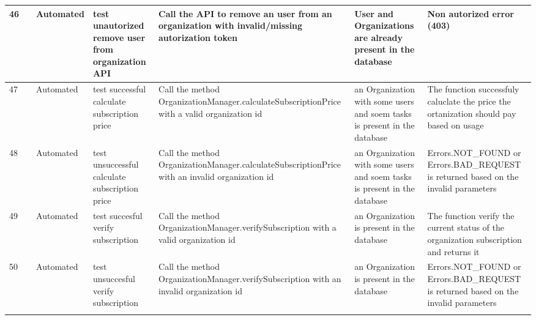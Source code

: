 \documentclass{article}
\begin{document}
{\begin{tabular}{|
      >{\columncolor[HTML]{FFFFFF}}l |
      >{\columncolor[HTML]{FFFFFF}}c |
      >{\columncolor[HTML]{FFFFFF}}l |l|l|l|l|}
    46 & \cellcolor[HTML]{FFFFFF}                                            & {\color[HTML]{11734B} Automated} & test unautorized remove user from organization API  & Call the API to remove an user from an organization with invalid/missing autorization token    & User and Organizations are already present in the database                                                                               & Non autorized error (403)                                                                                            \\ \cline{1-1} \cline{3-7}
    47 & \cellcolor[HTML]{FFFFFF}                                            & {\color[HTML]{11734B} Automated} & test successful calculate subscription price        & Call the method OrganizationManager.calculateSubscriptionPrice with a valid organization id    & an Organization with some users and soem tasks is present in the database                                                                & The function successfuly caluclate the price the ortanization should pay based on usage                              \\ \cline{1-1} \cline{3-7}
    48 & \cellcolor[HTML]{FFFFFF}                                            & {\color[HTML]{11734B} Automated} & test unsuccessful calculate subscription price      & Call the method OrganizationManager.calculateSubscriptionPrice with an invalid organization id & an Organization with some users and soem tasks is present in the database                                                                & Errors.NOT\_FOUND or Errors.BAD\_REQUEST is returned based on the invalid parameters                                 \\ \cline{1-1} \cline{3-7}
    49 & \cellcolor[HTML]{FFFFFF}                                            & {\color[HTML]{11734B} Automated} & test succesful verify subscription                  & Call the method OrganizationManager.verifySubscription with a valid organization id            & an Organization is present in the database                                                                                               & The function verify the current status of the organization subscription and returns it                               \\ \cline{1-1} \cline{3-7}
    50 & \cellcolor[HTML]{FFFFFF}                                            & {\color[HTML]{11734B} Automated} & test unsuccesful verify subscription                & Call the method OrganizationManager.verifySubscription with an invalid organization id         & an Organization is present in the database                                                                                               & Errors.NOT\_FOUND or Errors.BAD\_REQUEST is returned based on the invalid parameters                                 \\ \cline{1-1} \cline{3-7}

\end{tabular}}
\end{document}
